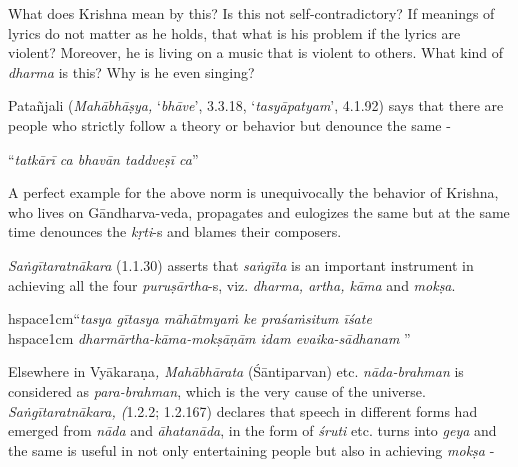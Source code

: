 What does Krishna mean by this? Is this not self-contradictory? If meanings of lyrics do not matter as he holds, that what is his problem if the lyrics are violent? Moreover, he is living on a music that is violent to others. What kind of \textit{dharma} is this? Why is he even singing?

Patañjali (\textit{Mahābhāṣya,} ‘\textit{bhāve}’, 3.3.18, ‘\textit{tasyāpatyam}’, 4.1.92) says that there are people who strictly follow a theory or behavior but denounce the same -

\begin{centerquote}
“\textit{tatkārī ca bhavān taddveṣī ca}”
\end{centerquote}

A perfect example for the above norm is unequivocally the behavior of Krishna, who lives on Gāndharva-veda, propagates and eulogizes the same but at the same time denounces the \textit{kṛti}-s and blames their composers. 

\textit{Saṅgītaratnākara} (1.1.30) asserts that \textit{saṅgīta} is an important instrument in achieving all the four \textit{puruṣārtha}-s, viz. \textit{dharma, artha, kāma} and \textit{mokṣa}.

\newpage

\begin{myquote}
hspace{1cm}“\textit{tasya gītasya māhātmyaṁ ke praśaṁsitum īśate} \\hspace{1cm} \textit{dharmārtha-kāma-mokṣāṇām idam evaika-sādhanam} ”
\end{myquote}

Elsewhere in Vyākaraṇa\textit{, Mahābhārata} (Śāntiparvan) etc. \textit{nāda-brahman} is considered as \textit{para-brahman}, which is the very cause of the universe. \textit{Saṅgītaratnākara, (}1.2.2; 1.2.167) declares that speech in different forms had emerged from \textit{nāda} and \textit{āhatanāda}, in the form of \textit{śruti} etc. turns into \textit{geya} and the same is useful in not only entertaining people but also in achieving \textit{mokṣa} -

